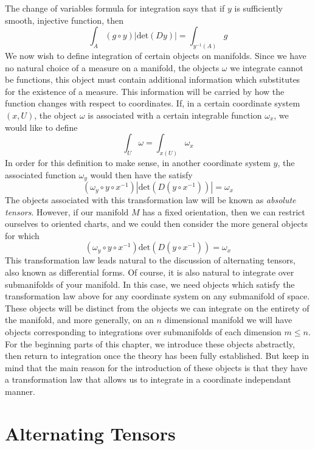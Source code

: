The change of variables formula for integration says that if $y$ is sufficiently smooth, injective function, then
%
\[ \int_A (g \circ y) |\text{det}(Dy)| = \int_{y^{-1}(A)} g \]
%
We now wish to define integration of certain objects on manifolds. Since we have no natural choice of a measure on a manifold, the objects $\omega$ we integrate cannot be functions, this object must contain additional information which substitutes for the existence of a measure. This information will be carried by how the function changes with respect to coordinates. If, in a certain coordinate system $(x,U)$, the object $\omega$ is associated with a certain integrable function $\omega_x$, we would like to define
%
\[ \int_U \omega = \int_{x(U)} \omega_x \]
%
In order for this definition to make sense, in another coordinate system $y$, the associated function $\omega_y$ would then have the satisfy
%
\[ (\omega_y \circ y \circ x^{-1}) |\text{det}(D(y \circ x^{-1}))| = \omega_x \]
%
The objects associated with this transformation law will be known as {\it absolute tensors}. However, if our manifold $M$ has a fixed orientation, then we can restrict ourselves to oriented charts, and we could then consider the more general objects for which
%
\[ (\omega_y \circ y \circ x^{-1}) \text{det}(D(y \circ x^{-1})) = \omega_x \]
%
This transformation law leads natural to the discussion of alternating tensors, also known as differential forms. Of course, it is also natural to integrate over submanifolds of your manifold. In this case, we need objects which satisfy the transformation law above for any coordinate system on any submanifold of space. These objects will be distinct from the objects we can integrate on the entirety of the manifold, and more generally, on an $n$ dimensional manifold we will have objects corresponding to integrations over submanifolds of each dimension $m \leq n$. For the beginning parts of this chapter, we introduce these objects abstractly, then return to integration once the theory has been fully established. But keep in mind that the main reason for the introduction of these objects is that they have a transformation law that allows us to integrate in a coordinate independant manner.

\section{Alternating Tensors}


